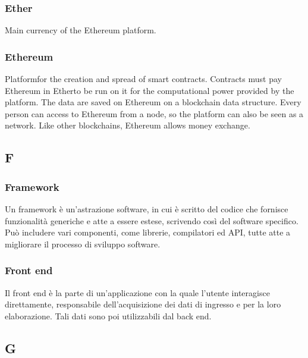 \subsubsection*{Ether}
Main currency of the Ethereum platform\glo.

\subsubsection*{Ethereum}
Platform\glosp for the creation and spread of smart contracts\glo. Contracts must pay Ethereum in Ether\glosp to be run on it for the computational power provided by the platform. The data are saved on Ethereum on a blockchain data structure. Every person can access to Ethereum from a node, so the platform can also be seen as a network. 
Like other blockchains, Ethereum allows money exchange.


\subsection*{F}

\subsubsection*{Framework}
Un framework è un'astrazione software, in cui è scritto del codice che fornisce funzionalità generiche e atte a essere estese, scrivendo così del software specifico. Può includere vari componenti, come librerie, compilatori ed API\glo, tutte atte a migliorare il processo di sviluppo software.

\subsubsection*{Front end}
Il front end è la parte di un'applicazione con la quale l'utente interagisce direttamente, responsabile dell'acquisizione dei dati di ingresso e per la loro elaborazione. Tali dati sono poi utilizzabili dal back end\glo. 

\subsection*{G}

